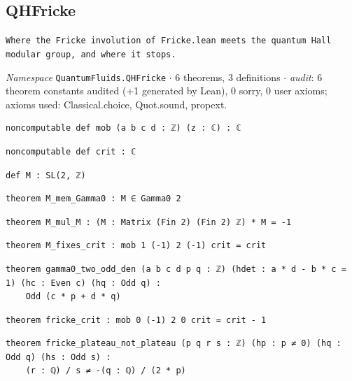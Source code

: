\subsection{QHFricke}\label{appA:QHFricke}
{\footnotesize\raggedright\texttt{Where the Fricke involution of Fricke.\allowbreak{}lean meets the quantum Hall modular group,\allowbreak{} and where it stops.\allowbreak{}}\par}
{\footnotesize\raggedright\emph{Namespace} \texttt{QuantumFluids.\allowbreak{}QHFricke} $\cdot$ 6 theorems, 3 definitions $\cdot$ \emph{audit}: 6 theorem constants audited (+1 generated by Lean), 0 sorry, 0 user axioms; axioms used: Classical.choice, Quot.sound, propext.\par}
\vspace{1pt}
\begin{lstlisting}[style=leancat]
noncomputable def mob (a b c d : ℤ) (z : ℂ) : ℂ
\end{lstlisting}

\begin{lstlisting}[style=leancat]
noncomputable def crit : ℂ
\end{lstlisting}

\begin{lstlisting}[style=leancat]
def M : SL(2, ℤ)
\end{lstlisting}

\begin{lstlisting}[style=leancat]
theorem M_mem_Gamma0 : M ∈ Gamma0 2
\end{lstlisting}

\begin{lstlisting}[style=leancat]
theorem M_mul_M : (M : Matrix (Fin 2) (Fin 2) ℤ) * M = -1
\end{lstlisting}

\begin{lstlisting}[style=leancat]
theorem M_fixes_crit : mob 1 (-1) 2 (-1) crit = crit
\end{lstlisting}

\begin{lstlisting}[style=leancat]
theorem gamma0_two_odd_den (a b c d p q : ℤ) (hdet : a * d - b * c = 1) (hc : Even c) (hq : Odd q) :
    Odd (c * p + d * q)
\end{lstlisting}

\begin{lstlisting}[style=leancat]
theorem fricke_crit : mob 0 (-1) 2 0 crit = crit - 1
\end{lstlisting}

\begin{lstlisting}[style=leancat]
theorem fricke_plateau_not_plateau (p q r s : ℤ) (hp : p ≠ 0) (hq : Odd q) (hs : Odd s) :
    (r : ℚ) / s ≠ -(q : ℚ) / (2 * p)
\end{lstlisting}

